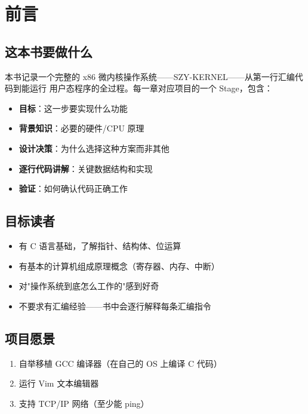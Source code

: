 \chapter{前言}

\section{这本书要做什么}

本书记录一个完整的 x86 微内核操作系统——SZY-KERNEL——从第一行汇编代码到能运行
用户态程序的全过程。每一章对应项目的一个 Stage，包含：

\begin{itemize}
  \item \textbf{目标}：这一步要实现什么功能
  \item \textbf{背景知识}：必要的硬件/CPU 原理
  \item \textbf{设计决策}：为什么选择这种方案而非其他
  \item \textbf{逐行代码讲解}：关键数据结构和实现
  \item \textbf{验证}：如何确认代码正确工作
\end{itemize}

\section{目标读者}

\begin{itemize}
  \item 有 C 语言基础，了解指针、结构体、位运算
  \item 有基本的计算机组成原理概念（寄存器、内存、中断）
  \item 对"操作系统到底怎么工作的"感到好奇
  \item 不要求有汇编经验——书中会逐行解释每条汇编指令
\end{itemize}

\section{项目愿景}

\begin{enumerate}
  \item 自举移植 GCC 编译器（在自己的 OS 上编译 C 代码）
  \item 运行 Vim 文本编辑器
  \item 支持 TCP/IP 网络（至少能 ping）
\end{enumerate}

